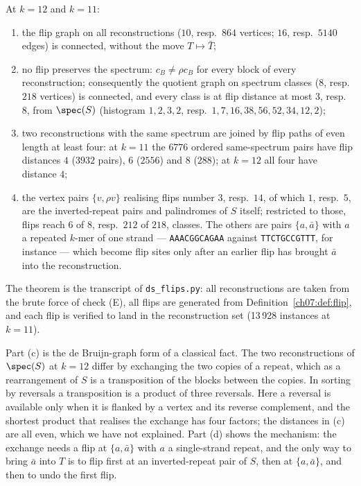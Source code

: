 \begin{theorem}\label{ch07:thm:flips}
At $k=12$ and $k=11$:
\begin{enumerate}
\item[\rm(a)] the flip graph on all reconstructions ($10$, resp.\ $864$ vertices; $16$,
resp.\ $5140$ edges) is connected, without the move $T\mapsto\bar T$;
\item[\rm(b)] no flip preserves the spectrum: $c_B\neq\rho c_B$ for every block of every
reconstruction; consequently the quotient graph on spectrum classes ($8$, resp.\ $218$
vertices) is connected, and every class is at flip distance at most $3$, resp.\ $8$, from
$\spec(S)$ (histogram $1,2,3,2$, resp.\ $1,7,16,38,56,52,34,12,2$);
\item[\rm(c)] two reconstructions with the same spectrum are joined by flip paths of even
length at least four: at $k=11$ the $6776$ ordered same-spectrum pairs have flip distances
$4$ ($3932$ pairs), $6$ ($2556$) and $8$ ($288$); at $k=12$ all four have distance $4$;
\item[\rm(d)] the vertex pairs $\{v,\rho v\}$ realising flips number $3$, resp.\ $14$, of
which $1$, resp.\ $5$, are the inverted-repeat pairs and palindromes of $S$ itself; restricted
to those, flips reach $6$ of $8$, resp.\ $212$ of $218$, classes. The others are pairs
$\{a,\bar a\}$ with $a$ a repeated $k$-mer of one strand --- \texttt{AAACGGCAGAA} against
\texttt{TTCTGCCGTTT}, for instance --- which become flip sites only after an earlier flip has
brought $\bar a$ into the reconstruction.
\end{enumerate}
\end{theorem}

The theorem is the transcript of \texttt{ds\_flips.py}: all reconstructions are taken from the
brute force of check (E), all flips are generated from Definition~\ref{ch07:def:flip}, and each
flip is verified to land in the reconstruction set (13\,928 instances at $k=11$).

\begin{remark}
Part (c) is the de Bruijn-graph form of a classical fact. The two reconstructions of
$\spec(S)$ at $k=12$ differ by exchanging the two copies of a repeat, which as a rearrangement
of $S$ is a transposition of the blocks between the copies. In sorting by reversals
\cite{BP96,HP99} a transposition is a product of three reversals. Here a reversal is
available only when it is flanked by a vertex and its reverse complement, and the shortest
product that realises the exchange has four factors; the distances in (c) are all even, which
we have not explained. Part (d) shows the mechanism: the exchange needs a flip at
$\{a,\bar a\}$ with $a$ a single-strand repeat, and the only way to bring $\bar a$ into $T$ is
to flip first at an inverted-repeat pair of $S$, then at $\{a,\bar a\}$, and then to undo the
first flip.
\end{remark}

